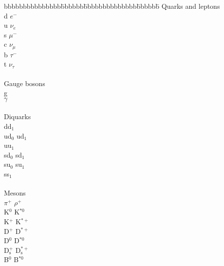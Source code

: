 \begin{tabbing}
bbbbbbbbbbbbbbb\=bbbbbb\=bbbbbbbbbbbbbb\=bbbbbb\= \kill
Quarks and leptons \> \> \> \> \\
       \>d                 \>$e^-$ \\
       \>u                 \>$\nu_e$ \\
       \>s                 \>$\mu^-$ \\
       \>c                 \>$\nu_{\mu}$ \\
       \>b                 \>$\tau^-$ \\
       \>t                 \>$\nu_{\tau}$ \\
\>\>\>\> \\
Gauge bosons \>\>\>\> \\
      \>g \>\> \\
      \>$\gamma$ \>\> \\
\>\>\>\> \\
Diquarks \>\>\>\> \\
\>                      \>                \>dd$_1$ \\
    \>ud$_0$          \>ud$_1$ \\
\>                      \>                \>uu$_1$ \\
    \>sd$_0$          \>sd$_1$ \\
    \>su$_0$          \>su$_1$ \\
\>                      \>                \>ss$_1$ \\
\>\>\>\> \\
Mesons \>\>\>\> \\
     \>$\pi^+$          \>$\rho^+$ \\
     \>K$^0$            \>K$^{*0}$ \\
     \>K$^+$            \>K$^{*+}$ \\
     \>D$^+$            \>D$^{*+}$ \\
     \>D$^0$            \>D$^{*0}$ \\
     \>D$_{\mbox{s}}^+$      
                                   \>D$_{\mbox{s}}^{*+}$ \\
     \>B$^0$            \>B$^{*0}$ \\

\end{tabbing}

